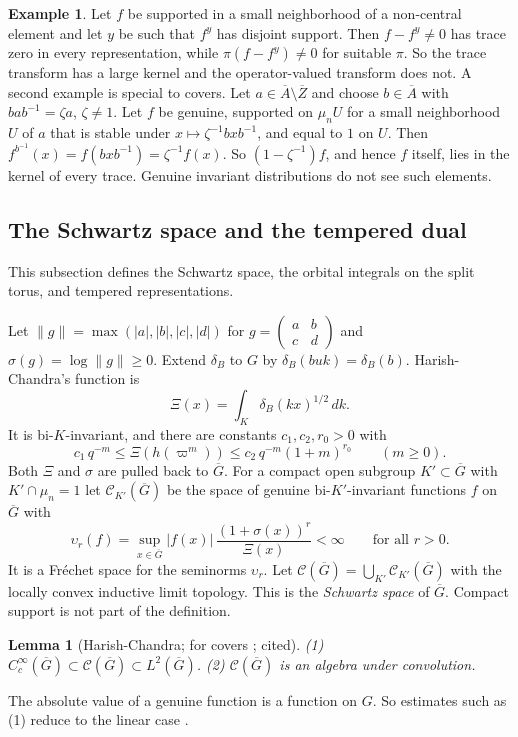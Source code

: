 \documentclass[12pt,letterpaper]{article}
\numberwithin{equation}{section}
\newtheorem{lemma}[theorem]{Lemma}
\theoremstyle{definition}
\newtheorem{xexample}[theorem]{Example}
\newcommand{\cited}{cited}
\newcommand{\vp}{\varpi}
\newcommand{\bG}{\overline{G}}
\newcommand{\bA}{\overline{A}}
\newcommand{\bZ}{\overline{Z}}
\newcommand{\calC}{\mathcal C}
\begin{document}
\begin{xexample}\label{ex:kernels}
Let $f$ be supported in a small neighborhood of a non-central element and let $y$ be such
that $f^y$ has disjoint support.  Then $f-f^y\ne0$ has trace zero in every representation,
while $\pi(f-f^y)\ne0$ for suitable $\pi$.  So the trace transform has a large kernel and
the operator-valued transform does not.  A second example is special to covers.  Let
$a\in\bA\setminus\bZ$ and choose $b\in\bA$ with $bab^{-1}=\zeta a$, $\zeta\ne1$.  Let $f$ be
genuine, supported on $\mu_nU$ for a small neighborhood $U$ of $a$ that is stable under
$x\mapsto\zeta^{-1}bxb^{-1}$, and equal to $1$ on $U$.  Then
$f^{b^{-1}}(x)=f(bxb^{-1})=\zeta^{-1}f(x)$.  So $(1-\zeta^{-1})f$, and hence $f$ itself, lies in
the kernel of every trace.  Genuine invariant distributions do not see such elements.
\end{xexample}

\subsection{The Schwartz space and the tempered dual}\label{subsec:schwartz}

This subsection defines the Schwartz space, the orbital integrals on the split torus, and
tempered representations.

Let $\|g\|=\max(|a|,|b|,|c|,|d|)$ for $g=\begin{pmatrix}a&b\\c&d\end{pmatrix}$ and
$\sigma(g)=\log\|g\|\ge0$.  Extend $\delta_B$ to $G$ by $\delta_B(buk)=\delta_B(b)$.
Harish-Chandra's function is
\[
\Xi(x)=\int_K\delta_B(kx)^{1/2}\,dk .
\]
It is bi-$K$-invariant, and there are constants $c_1,c_2,r_0>0$ with
\[
c_1\,q^{-m}\le\Xi(h(\vp^m))\le c_2\,q^{-m}(1+m)^{r_0}\qquad(m\ge0).
\]
Both $\Xi$ and $\sigma$ are pulled back to $\bG$.  For a compact open subgroup
$K'\subset\bG$ with $K'\cap\mu_n=1$ let $\calC_{K'}(\bG)$ be the space of genuine
bi-$K'$-invariant functions $f$ on $\bG$ with
\[
\upsilon_r(f)=\sup_{x\in\bG}|f(x)|\,\frac{(1+\sigma(x))^r}{\Xi(x)}<\infty\qquad\text{for all }r>0 .
\]
It is a Fr\'echet space for the seminorms $\upsilon_r$.  Let
$\calC(\bG)=\bigcup_{K'}\calC_{K'}(\bG)$ with the locally convex inductive limit topology.
This is the \emph{Schwartz space} of $\bG$.  Compact support is not part of the definition.

\begin{lemma}[Harish-Chandra; for covers \cite{Li12}; \cited]\label{lem:schwartz-alg}
(1) $C_c^\infty(\bG)\subset\calC(\bG)\subset L^2(\bG)$.
(2) $\calC(\bG)$ is an algebra under convolution.
\end{lemma}
The absolute value of a genuine function is a function on $G$.  So estimates such as (1)
reduce to the linear case \cite[\S4.4]{Si79}.
\end{document}
